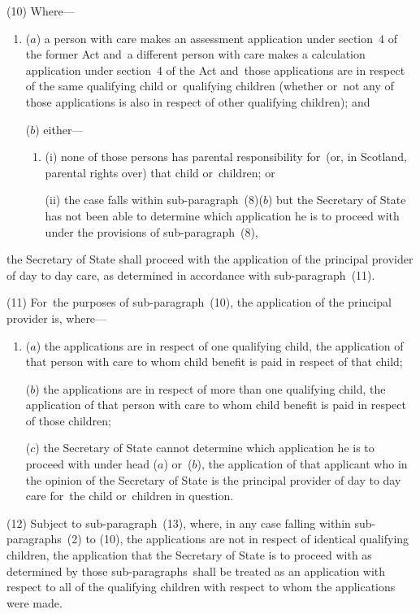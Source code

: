 \documentclass[12pt,a4paper]{article}
\begin{document}
(10) Where—
\begin{enumerate}\item[]
($a$) a person with care makes an assessment application under section~4 of the former Act and~a different person with care makes a calculation application under section~4 of the Act and~those applications are in respect of the same qualifying child or~qualifying children (whether or~not any of those applications is also in respect of other qualifying children); and

($b$) either—
\begin{enumerate}\item[]
(i) none of those persons has parental responsibility for~(or, in Scotland, parental rights over) that child or~children; or

(ii) the case falls within sub-paragraph~(8)($b$)  but the Secretary of State has not been able to determine which application he is to proceed with under the provisions of sub-paragraph~(8),
\end{enumerate}
\end{enumerate}
the Secretary of State shall proceed with the application of the principal provider of day to day care, as determined in accordance with sub-paragraph~(11).

(11) For~the purposes of sub-paragraph~(10), the application of the principal provider is, where—
\begin{enumerate}\item[]
($a$) the applications are in respect of one qualifying child, the application of that person with care to whom child benefit is paid in respect of that child;

($b$) the applications are in respect of more than one qualifying child, the application of that person with care to whom child benefit is paid in respect of those children;

($c$) the Secretary of State cannot determine which application he is to proceed with under head ($a$)  or~($b$), the application of that applicant who in the opinion of the Secretary of State is the principal provider of day to day care for~the child or~children in question.
\end{enumerate}

(12) Subject to sub-paragraph~(13), where, in any case falling within sub-paragraphs~(2) to (10), the applications are not in respect of identical qualifying children, the application that the Secretary of State is to proceed with as determined by those sub-paragraphs~shall be treated as an application with respect to all of the qualifying children with respect to whom the applications were made.
\end{document}
